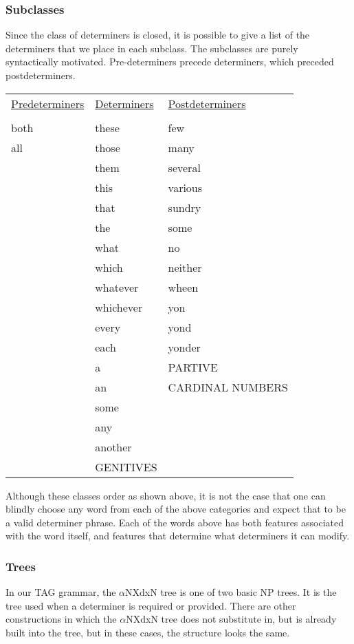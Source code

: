 \subsubsection{Subclasses}
Since the class of determiners is closed, it is possible to give a list of the
determiners that we place in each subclass.  The subclasses are
purely syntactically motivated.  Pre-determiners precede determiners, which
preceded postdeterminers.

\begin{tabular}{lll}

\underline{Predeterminers}&\underline{Determiners}&\underline{Postdeterminers}\\
&&\\
both&these&few\\
all&those&many\\
&them&several\\
&this&various\\
&that&sundry\\
&the&some\\
&what&no\\
&which&neither\\
&whatever&wheen\\
&whichever&yon\\
&every&yond\\
&each&yonder\\
&a&PARTIVE\\
&an&CARDINAL NUMBERS\\
&some&\\
&any&\\
&another&\\
&GENITIVES&\\
\end{tabular}
			
\vspace{.5cm}
Although these classes order as shown above, it is not the case that one can
blindly choose any word from each of the above categories and expect that to be
a valid determiner phrase.  Each of the words above has both features
associated with the word itself, and features that determine what determiners
it can modify.

\subsubsection{Trees}

In our TAG grammar, the $\alpha$NXdxN tree is one of two basic NP trees.  It is the
tree used when a determiner is required or provided.  There are other
constructions in which the $\alpha$NXdxN tree does not substitute in, but is already
built into the tree, but in these cases, the structure looks the same.

